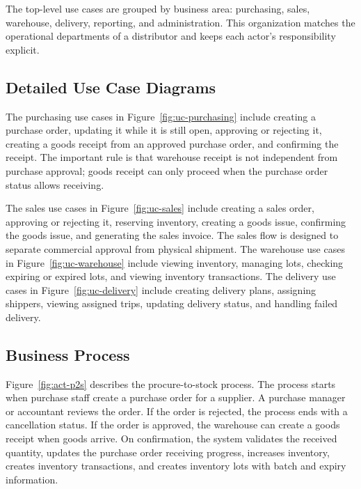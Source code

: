 The top-level use cases are grouped by business area: purchasing, sales,
warehouse, delivery, reporting, and administration. This organization matches
the operational departments of a distributor and keeps each actor's
responsibility explicit.

\subsection{Detailed Use Case Diagrams}
The purchasing use cases in Figure~\ref{fig:uc-purchasing} include creating a
purchase order, updating it while it is still open, approving or rejecting it,
creating a goods receipt from an approved purchase order, and confirming the
receipt. The important rule is that warehouse receipt is not independent from
purchase approval; goods receipt can only proceed when the purchase order status
allows receiving.

The sales use cases in Figure~\ref{fig:uc-sales} include creating a sales
order, approving or rejecting it, reserving inventory, creating a goods issue,
confirming the goods issue, and generating the sales invoice. The sales flow is
designed to separate commercial approval from physical shipment. The warehouse
use cases in Figure~\ref{fig:uc-warehouse} include viewing inventory, managing
lots, checking expiring or expired lots, and viewing inventory transactions. The
delivery use cases in Figure~\ref{fig:uc-delivery} include creating delivery
plans, assigning shippers, viewing assigned trips, updating delivery status, and
handling failed delivery.

\subsection{Business Process}
Figure~\ref{fig:act-p2s} describes the procure-to-stock process. The process
starts when purchase staff create a purchase order for a supplier. A purchase
manager or accountant reviews the order. If the order is rejected, the process
ends with a cancellation status. If the order is approved, the warehouse can
create a goods receipt when goods arrive. On confirmation, the system validates
the received quantity, updates the purchase order receiving progress, increases
inventory, creates inventory transactions, and creates inventory lots with batch
and expiry information.

